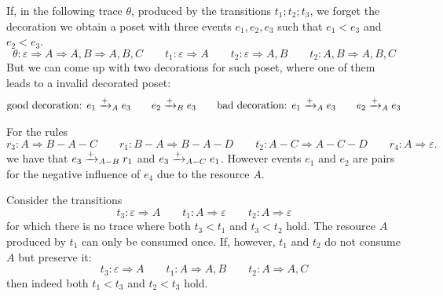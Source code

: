 
\begin{example}
  If, in the following trace $\theta$, produced by the transitions $t_1;t_2;t_3$, we forget the decoration we obtain a poset with three events $e_1,e_2,e_3$ such that $e_1<e_3$ and $e_2<e_3$.
  \[
  \theta:\varepsilon \Rightarrow A \Rightarrow A,B\Rightarrow A,B,C\qquad t_1: \varepsilon \Rightarrow A\qquad t_2: \varepsilon\Rightarrow A,B\qquad t_2: A,B\Rightarrow A,B,C
  \]
  But we can come up with two decorations for such poset, where one of them leads to a invalid decorated poset:
  \begin{align*}
  \text{good decoration: }e_1\mathrel{\xrightarrow{+}}_A e_3\qquad e_2\mathrel{\xrightarrow{+}}_B e_3\qquad
  \text{bad decoration: }e_1\mathrel{\xrightarrow{+}}_A e_3\qquad e_2\mathrel{\xrightarrow{+}}_A e_3
  \end{align*}
\end{example}

\begin{example}
  For the rules
  \[
  r_3: A \Rightarrow B-A-C\qquad r_1: B-A\Rightarrow B-A-D \qquad t_2: A-C\Rightarrow A-C-D\qquad r_4: A\Rightarrow \varepsilon.
  \]
  we have that $e_3\mathrel{\xrightarrow{+}}_{A-B} r_1$ and $e_3\mathrel{\xrightarrow{+}}_{A-C} e_1$. However events $e_1$ and $e_2$ are pairs for the negative influence of $e_4$ due to the resource $A$.
\end{example}

\begin{example}
  Consider the transitions
  \[
  t_3: \varepsilon \Rightarrow A\qquad t_1: A\Rightarrow \varepsilon \qquad t_2: A\Rightarrow \varepsilon
  \]
  for which there is no trace where both $t_3<t_1$ and $t_3<t_2$ hold. The resource $A$ produced by $t_1$ can only be consumed once.
  If, however, $t_1$ and $t_2$ do not consume $A$ but preserve it:
  \[
  t_3: \varepsilon \Rightarrow A\qquad t_1: A\Rightarrow A,B \qquad t_2: A\Rightarrow A,C
  \]
  then indeed both $t_1<t_3$ and $t_2<t_3$ hold.
\end{example}

